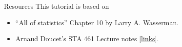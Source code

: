 \documentclass[
  ignorenonframetext,
]{beamer}
\begin{document}
\begin{frame}{Resources}
\protect{}\label{resources}
This tutorial is based on

\begin{itemize}
\item
  ``All of statistics'' Chapter 10 by Larry A. Wasserman.
\item
  Arnaud Doucet's STA 461 Lecture notes
  {[}\href{https://www.cs.ubc.ca/~arnaud/stat461/lecture_stat461_WaldRaoLRtests_handouts_2008.pdf}{links}{]}.
\end{itemize}
\end{frame}
\end{document}
